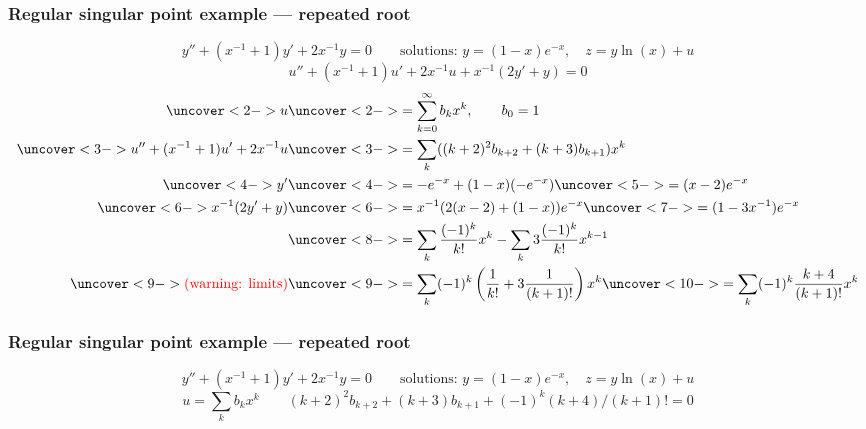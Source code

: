 \documentclass[9pt]{beamer}
\begin{document}
\begin{frame}[t]
 \frametitle{Regular singular point example --- repeated root}
 \vspace{-3ex} \[
     y''+(x^{-1}+1)y'+2x^{-1}y=0 \hspace{2em}
    \text{solutions: }
     y = (1-x)e^{-x},\quad
     z=y\ln(x)+u
 \]
 \[ u''+(x^{-1}+1)u'+2x^{-1}u + x^{-1}(2y'+y) = 0 \]
 \reminderbar
 \begin{align*}
  \uc<2->{u} &\uc<2->{= \sum_{k=0}^\infty b_kx^k,\qquad b_0 = 1} \\
  \uc<3->{u''+(x^{-1}+1)u'+2x^{-1}u} &\uc<3->{= 
   \sum_k ((k+2)^2b_{k+2}+(k+3)b_{k+1})x^k} \\
  \uc<4->{y'} &\uc<4->{= -e^{-x} + (1-x)(-e^{-x})}\uc<5->{ = (x-2)e^{-x}} \\
  \uc<6->{x^{-1}(2y'+y)} &\uc<6->{= x^{-1}(2(x-2)+(1-x))e^{-x}}\uc<7->{ = (1-3x^{-1}) e^{-x}} \\
   &\uc<8->{= \sum_k \frac{(-1)^k}{k!}x^k - \sum_k 3\frac{(-1)^k}{k!}x^{k-1}}\\
  \uc<9->{\text{\RED{(warning: limits)}}}
   &\uc< 9->{= \sum_k (-1)^k\left(\frac{1}{k!}+3\frac{1}{(k+1)!}\right)x^k} 
    \uc<10->{= \sum_k (-1)^k\frac{k+4}{(k+1)!}x^k}
 \end{align*}
\end{frame}

\begin{frame}[t]
 \frametitle{Regular singular point example --- repeated root}
 \vspace{-3ex} \[
     y''+(x^{-1}+1)y'+2x^{-1}y=0 \hspace{2em}
    \text{solutions: }
     y = (1-x)e^{-x},\quad
     z=y\ln(x)+u
 \]
 \[ u = \sum_kb_kx^k \qquad 
    (k+2)^2b_{k+2}+(k+3)b_{k+1}+(-1)^k(k+4)/(k+1)! =0
 \]
 \reminderbar

 
\end{frame}
\end{document}
